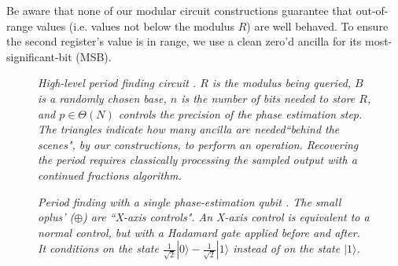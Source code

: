 \documentclass[twocolumn]{article}
\begin{document}
Be aware that none of our modular circuit constructions guarantee that out-of-range values (i.e. values not below the modulus $R$) are well behaved.
To ensure the second register's value is in range, we use a clean zero'd ancilla for its most-significant-bit (MSB).

\begin{figure}
  \centering
  \caption{\em
	High-level period finding circuit \cite{Shor1999}.
	$R$ is the modulus being queried, $B$ is a randomly chosen base, $n$ is the number of bits needed to store $R$, and $p \in \Theta(N)$ controls the precision of the phase estimation step.
    The triangles indicate how many ancilla are needed``behind the scenes", by our constructions, to perform an operation.
	Recovering the period requires classically processing the sampled output with a continued fractions algorithm.
  }
  \label{fig:period-finding}
\end{figure}

\begin{figure}
  \centering
  \caption{\em
	Period finding with a single phase-estimation qubit \cite{beauregard2003}.
	The small oplus' ({\tiny $\oplus$}) are ``X-axis controls".
	An X-axis control is equivalent to a normal control, but with a Hadamard gate applied before and after.
	It conditions on the state $\frac{1}{\sqrt 2}|0\rangle - \frac{1}{\sqrt 2}|1\rangle$ instead of on the state $|1\rangle$.
  }
  \label{fig:period-finding-solo-phase-qubit}
\end{figure}
\end{document}
